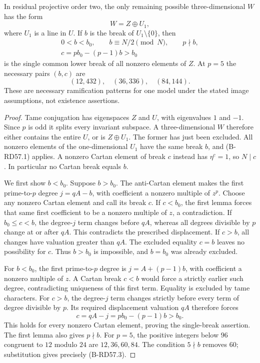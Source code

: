 \begin{lemma}
\label{lem:B-RD57-Cartan}
In residual projective order two, the only remaining possible
three-dimensional $W$ has the form
\[
                             W=Z\oplus U_1,
\]
where $U_1$ is a line in $U$. If $b$ is the break of
$U_1\setminus\{0\}$, then
\[
 \begin{gathered}
 0<b<b_0,\qquad b\equiv N/2\pmod N,\qquad p\nmid b,\\
 c=p b_0-(p-1)b>b_0                                      \tag{B-RD57.2}
 \end{gathered}
\]
is the single common lower break of all nonzero elements of $Z$.
At $p=5$ the necessary pairs $(b,c)$ are
\[
                       (12,432),\quad(36,336),\quad(84,144).
                                                        \tag{B-RD57.3}
\]
These are necessary ramification patterns for one model under the
stated image assumptions, not existence assertions.
\end{lemma}
\begin{proof}
Tame conjugation has eigenspaces $Z$ and $U$, with eigenvalues
$1$ and $-1$. Since $p$ is odd it splits every invariant subspace.
A three-dimensional $W$ therefore either contains the entire $U$,
or is $Z\oplus U_1$. The former has just been excluded.
All nonzero elements of the one-dimensional $U_1$ have the same
break $b$, and (B-RD57.1) applies. A nonzero Cartan element of
break $c$ instead has $\eta^c=1$, so $N\mid c$. In particular
no Cartan break equals $b$.

We first show $b<b_0$. Suppose $b>b_0$. The anti-Cartan element
makes the first prime-to-$p$ degree $j=qA-b$, with coefficient
a nonzero multiple of $z^p$. Choose any nonzero Cartan element
and call its break $c$. If $c<b_0$, the first lemma forces
that same first coefficient to be a nonzero multiple of $z$,
a contradiction. If $b_0\le c<b$, the degree-$j$ term changes
before $qA$, whereas all degrees divisible by $p$ change at or
after $qA$. This contradicts the prescribed displacement.
If $c>b$, all changes have valuation greater than $qA$.
The excluded equality $c=b$ leaves no possibility for $c$.
Thus $b>b_0$ is impossible, and $b=b_0$ was already excluded.

For $b<b_0$, the first prime-to-$p$ degree is
$j=A+(p-1)b$, with coefficient a nonzero multiple of $z$.
A Cartan break $c<b$ would force a strictly earlier such degree,
contradicting uniqueness of this first term. Equality is excluded
by tame characters. For $c>b$, the degree-$j$ term changes
strictly before every term of degree divisible by $p$.
Its required displacement valuation $qA$ therefore forces
\[
                   c=qA-j=p b_0-(p-1)b>b_0.
\]
This holds for every nonzero Cartan element, proving the single-break
assertion. The first lemma also gives $p\nmid b$.
For $p=5$, the positive integers below $96$ congruent to $12$
modulo $24$ are $12,36,60,84$. The condition $5\nmid b$
removes $60$; substitution gives precisely (B-RD57.3).
\end{proof}

